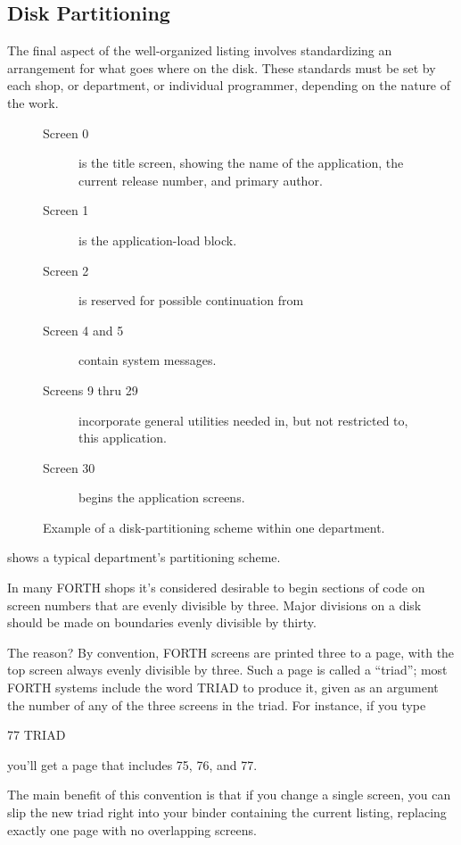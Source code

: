 \othersidetrue\subsection{Disk Partitioning}
\othersidefalse
The final aspect of the well-organized listing involves standardizing an
arrangement for what goes where on the disk.  These standards must be
set by each shop, or department, or individual programmer, depending on
the nature of the work.
\begin{figure*}
\caption{Example of a disk-partitioning scheme within one department.}

\begin{description}
\item[Screen 0] is the title screen, showing the name of the
    application, the current release number, and primary
    author.
\item[Screen 1] is the application-load block.
\item[Screen 2] is reserved for possible continuation from
\item[Screen 4 and 5] contain system messages.
\item[Screens 9 thru 29] incorporate general utilities needed
    in, but not restricted to, this application.
\item[Screen 30] begins the application screens.
\end{description}
\end{figure*}

 shows a typical department's partitioning scheme.

In many FORTH shops it's considered desirable to begin sections of
code on screen numbers that are evenly divisible by three.  Major divisions
on a disk should be made on boundaries evenly divisible by thirty.

The reason? By convention, FORTH screens are printed three to a
page, with the top screen always evenly divisible by three.  Such a page is
called a ``triad''; most FORTH systems include the word TRIAD to
produce it, given as an argument the number of any of the three screens
in the triad.  For instance, if you type
\begin{Code}
77 TRIAD
\end{Code}
you'll get a page that includes 75, 76, and 77.

The main benefit of this convention is that if you change a single
screen, you can slip the new triad right into your binder containing the
current listing, replacing exactly one page with no overlapping screens.

